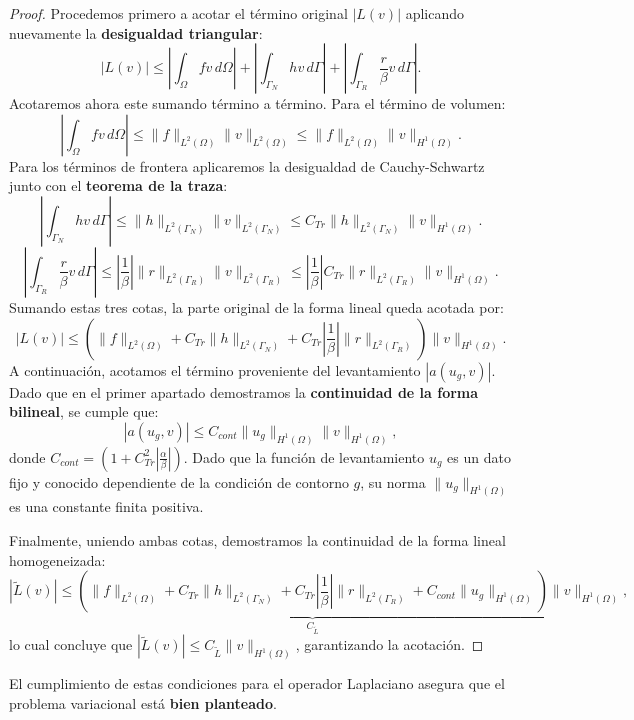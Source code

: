 \documentclass[11pt]{book}
\theoremstyle{plain} %
\theoremstyle{definition} %
\theoremstyle{definition} %
\begin{document}
\begin{itemize}
\begin{proof}
    Procedemos primero a acotar el término original $|L(v)|$ aplicando nuevamente la \textbf{desigualdad triangular}:
    \[ |L(v)| \leq \left| \int_\Omega fv \,d\Omega \right| +  \left| \int_{\Gamma_N}hv \, d\Gamma \right| + \left| \int_{\Gamma_R}\frac{r}{\beta}v \, d\Gamma \right|.\] 
    Acotaremos ahora este sumando término a término. Para el término de volumen:
    \[ \left| \int_\Omega fv \,d\Omega \right| \leq \|f\|_{L^2(\Omega)}\|v\|_{L^2(\Omega)}\leq \|f\|_{L^2(\Omega)}\|v\|_{H^1(\Omega)}.\]
    Para los términos de frontera aplicaremos la desigualdad de Cauchy-Schwartz junto con el \textbf{teorema de la traza}:
    \[ \left| \int_{\Gamma_N} hv \,d\Gamma \right| \leq \|h\|_{L^2(\Gamma_N)}\|v\|_{L^2(\Gamma_N)} \leq C_{Tr} \|h\|_{L^2(\Gamma_N)} \|v\|_{H^1(\Omega)}.\]
    \[ \left| \int_{\Gamma_R}\frac{r}{\beta}v \, d\Gamma \right| \leq \left|\frac{1}{\beta} \right| \|r\|_{L^2(\Gamma_R)}\|v\|_{L^2(\Gamma_R)} \leq  \left|\frac{1}{\beta} \right| C_{Tr} \|r\|_{L^2(\Gamma_R)}\|v\|_{H^1(\Omega)}.\]
    Sumando estas tres cotas, la parte original de la forma lineal queda acotada por:
    \[ |L(v)| \leq \left( \|f\|_{L^2(\Omega)} + C_{Tr} \|h\|_{L^2(\Gamma_N)} + C_{Tr} \left|\frac{1}{\beta} \right|\|r\|_{L^2(\Gamma_R)} \right)\|v\|_{H^1(\Omega)}. \]
    A continuación, acotamos el término proveniente del levantamiento $|a(u_g, v)|$. Dado que en el primer apartado demostramos la \textbf{continuidad de la forma bilineal}, se cumple que:
    \[ |a(u_g, v)| \leq C_{cont} \|u_g\|_{H^1(\Omega)} \|v\|_{H^1(\Omega)}, \]
    donde $C_{cont} = \left(1+C^2_{Tr}\left|\frac{\alpha}{\beta}\right|\right)$. Dado que la función de levantamiento $u_g$ es un dato fijo y conocido dependiente de la condición de contorno $g$, su norma $\|u_g\|_{H^1(\Omega)}$ es una constante finita positiva.

    Finalmente, uniendo ambas cotas, demostramos la continuidad de la forma lineal homogeneizada:
    \[ |\widetilde{L}(v)| \leq \underbrace{\left( \|f\|_{L^2(\Omega)} + C_{Tr} \|h\|_{L^2(\Gamma_N)} + C_{Tr} \left|\frac{1}{\beta} \right|\|r\|_{L^2(\Gamma_R)} + C_{cont}\|u_g\|_{H^1(\Omega)} \right)}_{C_{\widetilde{L}}} \|v\|_{H^1(\Omega)}, \]
    lo cual concluye que $|\widetilde{L}(v)| \leq C_{\widetilde{L}}\|v\|_{H^1(\Omega)}$, garantizando la acotación.
    \end{proof}
\end{itemize}

El cumplimiento de estas condiciones para el operador Laplaciano asegura que el problema variacional está \textbf{bien planteado}.
\end{document}
